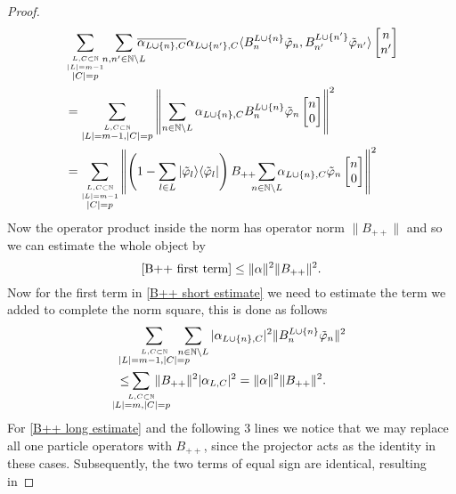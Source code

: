 \documentclass[b5paper,draft,openbib,12pt]{memoir}
\begin{document}
\begin{proof}
\begin{align}\nonumber
&\sum_{\overset{L,C\subset \mathbb{N}}{\overset{|L|=m-1}{|C|=p}}}\hspace{-0.1cm}\sum_{n,n'\in\mathbb{N}\backslash L} \hspace{-0.3cm}\overline{\alpha_{L\cup\{n\},C}}\alpha_{L\cup\{n'\},C} 
 \langle B^{L\cup\{n\}}_n \tilde{\varphi}_{n}, B^{L\cup\{n'\}}_{n'}\tilde{\varphi}_{n'}\rangle \left[\begin{matrix}n\\n'\end{matrix}\right]\\\nonumber
 &=\sum_{\overset{L,C\subset \mathbb{N}}{|L|=m-1,|C|=p}}\left\|\sum_{n\in\mathbb{N}\backslash L}\alpha_{L\cup\{n\},C}  B^{L\cup\{n\}}_n \tilde{\varphi}_{n} \left[\begin{matrix}n\\0\end{matrix}\right] \right\|^2\\\label{B++ first term}
&=\sum_{\overset{L,C\subset \mathbb{N}}{\overset{|L|=m-1}{|C|=p}}}\left\|\left(1-\sum_{l\in L}|\tilde{\varphi}_l\rangle\langle \tilde{\varphi}_l | \right)B_{++}\hspace{-0.2cm}\sum_{n\in\mathbb{N}\backslash L}\hspace{-0.2cm}\alpha_{L\cup\{n\},C}  \tilde{\varphi}_{n} \left[\begin{matrix}n\\0\end{matrix}\right]\right\|^2
\end{align}
Now the operator product inside the norm has operator norm \(\|B_{++}\|\) and so we can estimate the whole object by
\begin{equation}\label{B++estimatefinal1}
\eqref{B++ first term}\le \|\alpha\|^2 \|B_{++}\|^2.
\end{equation}
Now for the first term in \eqref{B++ short estimate} we need to estimate the term we added to complete the norm square, this is done as follows
\begin{align}\nonumber
&\sum_{\overset{L,C\subset\mathbb{N}}{|L|=m-1,|C|=p}} \hspace{-0.4cm}\sum_{n\in\mathbb{N}\backslash L} |\alpha_{L\cup\{n\},C}|^2 \|B_n^{L\cup\{n\}} \tilde{\varphi}_{n}\|^2\\\label{B++estimatefinal2}
&\le \hspace{-0.6cm}\sum_{\overset{L,C\subset\mathbb{N}}{|L|=m,|C|=p}}\hspace{-0.5cm} \|B_{++}\|^2|\alpha_{L,C}|^2 =\|\alpha\|^2 \|B_{++}\|^2.
\end{align}
For \eqref{B++ long estimate} and the following 3 lines we notice that 
we may replace all one particle operators with \(B_{++}\), since 
the projector acts as the identity in these cases. Subsequently, the 
two terms of equal sign are identical, resulting in 


\end{proof}
\end{document}
